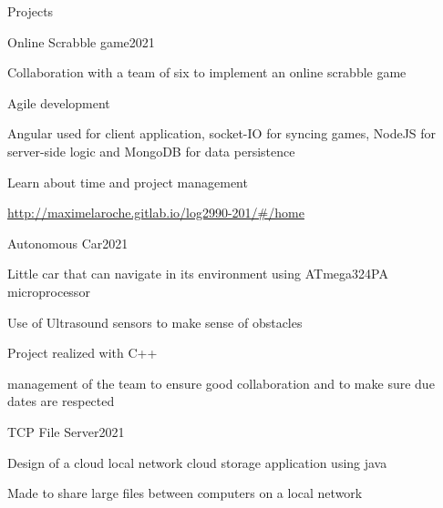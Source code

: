 \documentclass{resume} %
\begin{document}
	\begin{rSection}{Projects}
		\begin{rSubsection}{Online Scrabble game}{2021}{}{}
			\item Collaboration with a team of six to implement an online scrabble game
			\item Agile development
			\item Angular used for client application, socket-IO for syncing games, NodeJS for server-side logic and MongoDB for data persistence
			\item Learn about time and project management
			\item \url{http://maximelaroche.gitlab.io/log2990-201/#/home}
		 \end{rSubsection}
		\begin{rSubsection}{Autonomous Car}{2021}{}{}
			\item Little car that can navigate in its environment using ATmega324PA microprocessor
			\item Use of Ultrasound sensors to make sense of obstacles
			\item Project realized with C++
			\item management of the team to ensure good collaboration and to make sure due dates are respected
		 \end{rSubsection}

		 \begin{rSubsection}{TCP File Server}{2021}{}{}
			\item Design of a cloud local network cloud storage application using java
			\item Made to share large files between computers on a local network
		\end{rSubsection}


\end{rSection}
\end{document}

